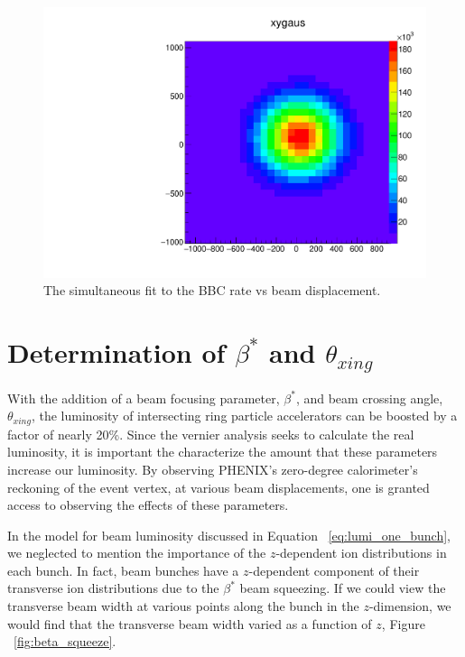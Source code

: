 \begin{figure}
  \centering
  \includegraphics[width=0.8\linewidth]{./figures/beam_width_359711.pdf}
  \caption{
    The simultaneous fit to the BBC rate vs beam displacement.
  }
  \label{fig:width_true}
\end{figure}

\section{Determination of $\beta^*$ and $\theta_{xing}$}
\label{sec:hourglass_correction}

With the addition of a beam focusing parameter, $\beta^*$, and beam crossing
angle, $\theta_{xing}$, the luminosity of intersecting ring particle
accelerators can be boosted by a factor of nearly 20\%. Since the vernier
analysis seeks to calculate the real luminosity, it is important the
characterize the amount that these parameters increase our luminosity. By
observing PHENIX's zero-degree calorimeter's reckoning of the event vertex, at
various beam displacements, one is granted access to observing the effects of
these parameters.

In the model for beam luminosity discussed in Equation ~\ref{eq:lumi_one_bunch},
we neglected to  mention the importance of the $z$-dependent ion distributions
in each bunch. In fact, beam bunches have a $z$-dependent component of their
transverse ion distributions due to the $\beta^*$ beam squeezing. If we could
view the transverse beam width at various points along the bunch in the
$z$-dimension, we would find that the transverse beam width varied as a function
of $z$, Figure ~\ref{fig:beta_squeeze}.

